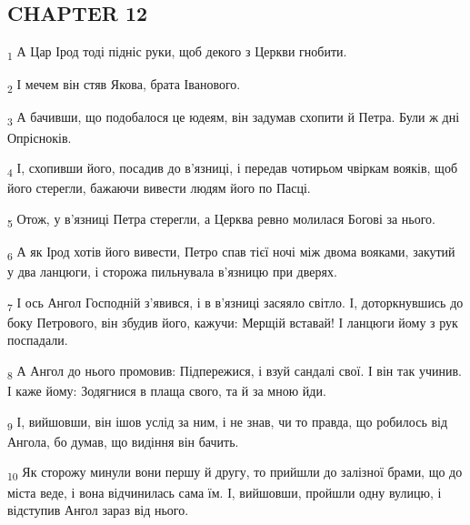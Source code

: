 \subsection{CHAPTER 12}
\begin{tcolorbox}
\textsubscript{1} А Цар Ірод тоді підніс руки, щоб декого з Церкви гнобити.
\end{tcolorbox}
\begin{tcolorbox}
\textsubscript{2} І мечем він стяв Якова, брата Іванового.
\end{tcolorbox}
\begin{tcolorbox}
\textsubscript{3} А бачивши, що подобалося це юдеям, він задумав схопити й Петра. Були ж дні Опрісноків.
\end{tcolorbox}
\begin{tcolorbox}
\textsubscript{4} І, схопивши його, посадив до в'язниці, і передав чотирьом чвіркам вояків, щоб його стерегли, бажаючи вивести людям його по Пасці.
\end{tcolorbox}
\begin{tcolorbox}
\textsubscript{5} Отож, у в'язниці Петра стерегли, а Церква ревно молилася Богові за нього.
\end{tcolorbox}
\begin{tcolorbox}
\textsubscript{6} А як Ірод хотів його вивести, Петро спав тієї ночі між двома вояками, закутий у два ланцюги, і сторожа пильнувала в'язницю при дверях.
\end{tcolorbox}
\begin{tcolorbox}
\textsubscript{7} І ось Ангол Господній з'явився, і в в'язниці засяяло світло. І, доторкнувшись до боку Петрового, він збудив його, кажучи: Мерщій вставай! І ланцюги йому з рук поспадали.
\end{tcolorbox}
\begin{tcolorbox}
\textsubscript{8} А Ангол до нього промовив: Підпережися, і взуй сандалі свої. І він так учинив. І каже йому: Зодягнися в плаща свого, та й за мною йди.
\end{tcolorbox}
\begin{tcolorbox}
\textsubscript{9} І, вийшовши, він ішов услід за ним, і не знав, чи то правда, що робилось від Ангола, бо думав, що видіння він бачить.
\end{tcolorbox}
\begin{tcolorbox}
\textsubscript{10} Як сторожу минули вони першу й другу, то прийшли до залізної брами, що до міста веде, і вона відчинилась сама їм. І, вийшовши, пройшли одну вулицю, і відступив Ангол зараз від нього.
\end{tcolorbox}
